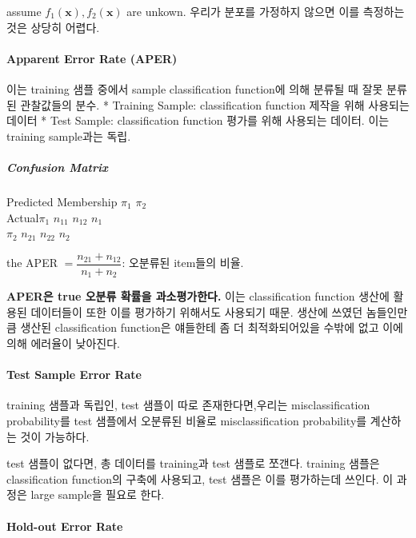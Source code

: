 \documentclass[
]{book}
\begin{document}
{{{assume \(f_1(\pmb x), f_2(\pmb x)\) are unkown. 우리가 분포를 가정하지 않으면 이를 측정하는 것은 상당히 어렵다.

\hypertarget{apparent-error-rate-aper}{%
\paragraph{Apparent Error Rate (APER)}\label{apparent-error-rate-aper}}

이는 training 샘플 중에서 sample classification function에 의해 분류될 때 잘못 분류된 관찰값들의 분수.
* Training Sample: classification function 제작을 위해 사용되는 데이터
* Test Sample: classification function 평가를 위해 사용되는 데이터. 이는 training sample과는 독립.

\hypertarget{confusion-matrix}{%
\subparagraph{Confusion Matrix}\label{confusion-matrix}}

\textbar{} Predicted Membership \(\pi_1\) \textbar{} \(\pi_2\) \textbar{} \textbar{}\\
Actual\(\pi_1\) \textbar{} \(n_{11}\) \textbar{} \(n_{12}\) \textbar{} \(n_1\) \textbar{}\\
\(\pi_2\) \textbar{} \(n_{21}\) \textbar{} \(n_{22}\) \textbar{} \(n_2\) \textbar{}

the APER \(= \dfrac {n_{21} + n_{12}} {n_1 + n_2}\): 오분류된 item들의 비율.

\textbf{APER은 true 오분류 확률을 과소평가한다.} 이는 classification function 생산에 활용된 데이터들이 또한 이를 평가하기 위해서도 사용되기 때문. 생산에 쓰였던 놈들인만큼 생산된 classification function은 얘들한테 좀 더 최적화되어있을 수밖에 없고 이에 의해 에러율이 낮아진다.

\hypertarget{test-sample-error-rate}{%
\paragraph{Test Sample Error Rate}\label{test-sample-error-rate}}

training 샘플과 독립인, test 샘플이 따로 존재한다면,우리는 misclassification probability를 test 샘플에서 오분류된 비율로 misclassification probability를 계산하는 것이 가능하다.

test 샘플이 없다면, 총 데이터를 training과 test 샘플로 쪼갠다. training 샘플은 classification function의 구축에 사용되고, test 샘플은 이를 평가하는데 쓰인다. 이 과정은 large sample을 필요로 한다.

\hypertarget{hold-out-error-rate}{%
\paragraph{Hold-out Error Rate}\label{hold-out-error-rate}}

}}}
\end{document}
